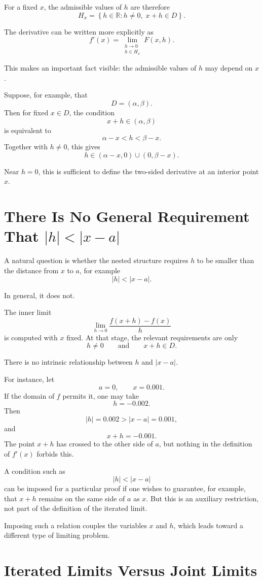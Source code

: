 \documentclass{essay}
\begin{document}
For a fixed \(x\), the admissible values of \(h\) are therefore
\[ H_{x} = \left\{ h\in\mathbb{R}: h\neq 0,\; x+h\in D \right\}. \]

The derivative can be written more explicitly as
\[
f'(x)
=
\lim_{\substack{h\to 0\\ h\in H_{x}}}
F(x,h).
\]

This makes an important fact visible: the admissible values of \(h\) may depend on \(x\).

Suppose, for example, that
\[ D=(\alpha,\beta). \]
Then for fixed \(x\in D\), the condition
\[ x+h\in(\alpha,\beta) \]
is equivalent to
\[ \alpha-x<h<\beta-x. \]
Together with \(h\neq 0\), this gives
\[ h\in(\alpha-x,0)\cup(0,\beta-x). \]

Near \(h=0\), this is sufficient to define the two-sided derivative at an interior point \(x\).

\section{There Is No General Requirement That \texorpdfstring{\( |h|<|x-a| \)}{|h|<|x-a|}}

A natural question is whether the nested structure requires \(h\) to be smaller than the distance from \(x\) to \(a\), for example
\[ |h|<|x-a|. \]

In general, it does not.

The inner limit
\[ \lim_{h\to 0} \frac{f(x+h)-f(x)}{h} \]
is computed with \(x\) fixed. At that stage, the relevant requirements are only
\[ h\neq 0 \qquad\text{and}\qquad x+h\in D. \]

There is no intrinsic relationship between \(h\) and \(|x-a|\).

For instance, let
\[ a=0, \qquad x=0.001. \]
If the domain of \(f\) permits it, one may take
\[ h=-0.002. \]
Then
\[ |h|=0.002>|x-a|=0.001, \]
and
\[ x+h=-0.001. \]
The point \(x+h\) has crossed to the other side of \(a\), but nothing in the definition of \(f'(x)\) forbids this.

A condition such as
\[ |h|<|x-a| \]
can be imposed for a particular proof if one wishes to guarantee, for example, that \(x+h\) remains on the same side of \(a\) as \(x\). But this is an auxiliary restriction, not part of the definition of the iterated limit.

Imposing such a relation couples the variables \(x\) and \(h\), which leads toward a different type of limiting problem.

\section{Iterated Limits Versus Joint Limits}
\end{document}
